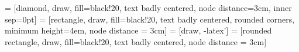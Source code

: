\usepackage{tikz}
\usetikzlibrary{shapes,arrows}

 = [diamond, draw, fill=black!20, text badly centered, node distance=3cm, inner sep=0pt]
 = [rectangle, draw, fill=black!20, text badly centered, rounded corners, minimum height=4em, node distance = 3cm]
 = [draw, -latex']
 = [rounded rectangle, draw, fill=black!20, text badly centered, node distance = 3cm]
